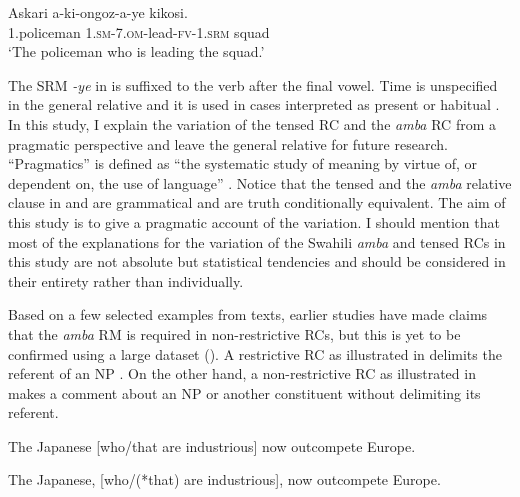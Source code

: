 \documentclass[output=paper,colorlinks,citecolor=brown]{langscibook}
\begin{document}
\ea%
    \label{ex:mwamzandi:3}
    \gll    Askari a-ki-ongoz-a-ye kikosi.\\
            1.policeman  \textsc{1.sm-7.om-}lead\textsc{-fv-1.srm}  squad\\
    \glt    ‘The policeman who is leading the squad.’
\z

The SRM \textit{-ye} in  is suffixed to the verb after the final vowel. Time is unspecified in the general relative and it is used in cases interpreted as present or habitual \citep{Ashton1944}. In this study, I explain the variation of the tensed RC and the \textit{amba} RC from a pragmatic perspective and leave the general relative for future research. “Pragmatics” is defined as “the systematic study of meaning by virtue of, or dependent on, the use of language” \citep[2]{Huang2007}. Notice that the tensed and the \textit{amba} relative clause in  and  are grammatical and are truth conditionally equivalent. The aim of this study is to give a pragmatic account of the variation. I should mention that most of the explanations for the variation of the Swahili \textit{amba} and tensed RCs in this study are not absolute but statistical tendencies and should be considered in their entirety rather than individually.

Based on a few selected examples from texts, earlier studies have made claims that the \textit{amba} RM is required in non-restrictive RCs, but this is yet to be confirmed using a large dataset (\citealt{Ashton1944, Schadeberg1989}). A restrictive RC as illustrated in  delimits the referent of an NP \citep[206]{Andrews2007}. On the other hand, a non-restrictive RC as illustrated in  makes a comment about an NP or another constituent without delimiting its referent. 

\ea%
    \label{ex:mwamzandi:4}
    The Japanese [who/that are industrious] now outcompete Europe.
\z

\ea%
    \label{ex:mwamzandi:5}
    The Japanese, [who/(*that) are industrious], now outcompete Europe. \hfill \citep[168]{Keenan1985}
\z
\end{document}
